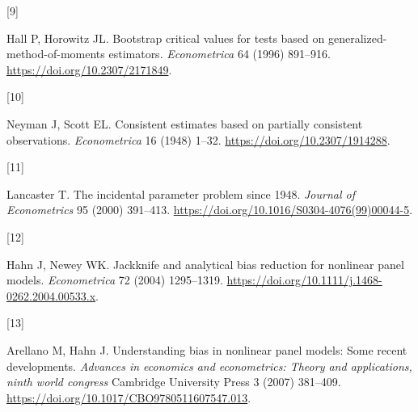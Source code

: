 \documentclass[
  american,
  11pt,
]{article}
\newlength{\cslhangindent}
\newlength{\csllabelwidth}
\newenvironment{CSLReferences}[2] %
 {\begin{list}{}{%
  \setlength{\itemindent}{0pt}
  \setlength{\leftmargin}{0pt}
  \setlength{\parsep}{0pt}
  \ifodd #1
   \setlength{\leftmargin}{\cslhangindent}
   \setlength{\itemindent}{-1\cslhangindent}
  \fi
  \setlength{\itemsep}{#2\baselineskip}}}
 {\end{list}}
\newcommand{\CSLLeftMargin}[1]{\parbox[t]{\csllabelwidth}{\strut#1\strut}}
\newcommand{\CSLRightInline}[1]{\parbox[t]{\linewidth - \csllabelwidth}{\strut#1\strut}}
\begin{document}
\begin{CSLReferences}{0}{0}
\CSLLeftMargin{{[}9{]} }%
\CSLRightInline{Hall P, Horowitz JL. Bootstrap critical values for tests
based on generalized-method-of-moments estimators. \emph{Econometrica}
64 (1996) 891--916. \url{https://doi.org/10.2307/2171849}.}

\CSLLeftMargin{{[}10{]} }%
\CSLRightInline{Neyman J, Scott EL. Consistent estimates based on
partially consistent observations. \emph{Econometrica} 16 (1948) 1--32.
\url{https://doi.org/10.2307/1914288}.}

\CSLLeftMargin{{[}11{]} }%
\CSLRightInline{Lancaster T. The incidental parameter problem since
1948. \emph{Journal of Econometrics} 95 (2000) 391--413.
\url{https://doi.org/10.1016/S0304-4076(99)00044-5}.}

\CSLLeftMargin{{[}12{]} }%
\CSLRightInline{Hahn J, Newey WK. Jackknife and analytical bias
reduction for nonlinear panel models. \emph{Econometrica} 72 (2004)
1295--1319. \url{https://doi.org/10.1111/j.1468-0262.2004.00533.x}.}

\CSLLeftMargin{{[}13{]} }%
\CSLRightInline{Arellano M, Hahn J. Understanding bias in nonlinear
panel models: Some recent developments. \emph{Advances in economics and
econometrics: Theory and applications, ninth world congress} Cambridge
University Press 3 (2007) 381--409.
\url{https://doi.org/10.1017/CBO9780511607547.013}.}

\end{CSLReferences}
\end{document}
